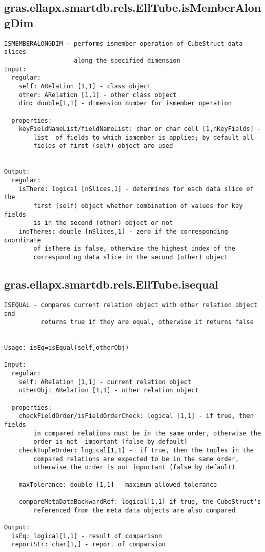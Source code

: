 \subsection{\texorpdfstring{gras.ellapx.smartdb.rels.EllTube.isMemberAlongDim}{isMemberAlongDim}}\label{method:gras.ellapx.smartdb.rels.EllTube.isMemberAlongDim}
\begin{verbatim}
ISMEMBERALONGDIM - performs ismember operation of CubeStruct data slices
                   along the specified dimension
Input:
  regular:
    self: ARelation [1,1] - class object
    other: ARelation [1,1] - other class object
    dim: double[1,1] - dimension number for ismember operation

  properties:
    keyFieldNameList/fieldNameList: char or char cell [1,nKeyFields] -
        list  of fields to which ismember is applied; by default all
        fields of first (self) object are used


Output:
  regular:
    isThere: logical [nSlices,1] - determines for each data slice of the
        first (self) object whether combination of values for key fields
        is in the second (other) object or not
    indTheres: double [nSlices,1] - zero if the corresponding coordinate
        of isThere is false, otherwise the highest index of the
        corresponding data slice in the second (other) object
\end{verbatim}
\subsection{\texorpdfstring{gras.ellapx.smartdb.rels.EllTube.isequal}{isequal}}\label{method:gras.ellapx.smartdb.rels.EllTube.isequal}
\begin{verbatim}
ISEQUAL - compares current relation object with other relation object and
          returns true if they are equal, otherwise it returns false


Usage: isEq=isEqual(self,otherObj)

Input:
  regular:
    self: ARelation [1,1] - current relation object
    otherObj: ARelation [1,1] - other relation object

  properties:
    checkFieldOrder/isFieldOrderCheck: logical [1,1] - if true, then fields
        in compared relations must be in the same order, otherwise the
        order is not  important (false by default)
    checkTupleOrder: logical[1,1] -  if true, then the tuples in the
        compared relations are expected to be in the same order,
        otherwise the order is not important (false by default)

    maxTolerance: double [1,1] - maximum allowed tolerance

    compareMetaDataBackwardRef: logical[1,1] if true, the CubeStruct's
        referenced from the meta data objects are also compared

Output:
  isEq: logical[1,1] - result of comparison
  reportStr: char[1,] - report of comparsion
\end{verbatim}

